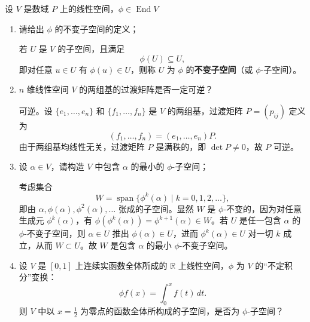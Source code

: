 \documentclass[lang=cn,12pt]{elegantbook}
\begin{document}
\begin{example}
     设 \(V\) 是数域 \(P\) 上的线性空间，\(\phi \in \operatorname{End}V\)
    \begin{enumerate}
        \item[(1)] 请给出 \(\phi\) 的不变子空间的定义；
    
        \begin{solution}
            若 \(U\) 是 \(V\) 的子空间，且满足
            \[
            \phi(U) \subseteq  U,
            \]
            即对任意 \(u \in U\) 有 \(\phi(u) \in U\)，则称 \(U\) 为 \(\phi\) 的\textbf{不变子空间}（或 \(\phi\)-子空间）。
        \end{solution}
    
        \item[(2)] \(n\) 维线性空间 \(V\) 的两组基的过渡矩阵是否一定可逆？
    
        \begin{solution}
            可逆。设 \(\{e_1,\dots,e_n\}\) 和 \(\{f_1,\dots,f_n\}\) 是 \(V\) 的两组基，过渡矩阵 \(P = (p_{ij})\) 定义为
            \[
            (f_1,\dots,f_n) = (e_1,\dots,e_n) P.
            \]
            由于两组基均线性无关，过渡矩阵 \(P\) 是满秩的，即 \(\det P \neq 0\)，故 \(P\) 可逆。
        \end{solution}
    
        \item[(3)] 设 \(\alpha \in V\)，请构造 \(V\) 中包含 \(\alpha\) 的最小的 \(\phi\)-子空间；
    
        \begin{solution}
            考虑集合
            \[
            W = \operatorname{span}\{\phi^k(\alpha) \mid k = 0,1,2,\dots\},
            \]
            即由 \(\alpha, \phi(\alpha), \phi^2(\alpha), \dots\) 张成的子空间。显然 \(W\) 是 \(\phi\)-不变的，因为对任意生成元 \(\phi^k(\alpha)\)，有 \(\phi(\phi^k(\alpha)) = \phi^{k+1}(\alpha) \in W\)。若 \(U\) 是任一包含 \(\alpha\) 的 \(\phi\)-不变子空间，则 \(\alpha \in U\) 推出 \(\phi(\alpha) \in U\)，进而 \(\phi^k(\alpha) \in U\) 对一切 \(k\) 成立，从而 \(W \subset U\)。故 \(W\) 是包含 \(\alpha\) 的最小 \(\phi\)-不变子空间。
        \end{solution}
    
        \item[(4)] 设 \(V\) 是 \([0,1]\) 上连续实函数全体所成的 \(\mathbb{R}\) 上线性空间，\(\phi\) 为 \(V\) 的“不定积分”变换：
            \[
            \phi f(x) = \int_0^x f(t)\,dt.
            \]
            则 \(V\) 中以 \(x = \frac{1}{2}\) 为零点的函数全体所构成的子空间，是否为 \(\phi\)-子空间？
    

\end{enumerate}
\end{example}
\end{document}
